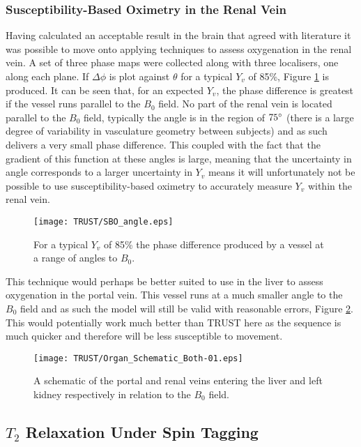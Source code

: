 \subsubsection{Susceptibility-Based Oximetry in the Renal Vein}
Having calculated an acceptable result in the brain that agreed with literature it was possible to move onto applying techniques to assess oxygenation in the renal vein. A set of three phase maps were collected along with three localisers, one along each plane. If $\Delta \phi$ is plot against $\theta$ for a typical $Y_v$ of 85\%, Figure \ref{fig:SBO_kidney} is produced. It can be seen that, for an expected $Y_v$, the phase difference is greatest if the vessel runs parallel to the $B_0$ field. No part of the renal vein is located parallel to the $B_0$ field, typically the angle is in the region of $75\degree$ (there is a large degree of variability in vasculature geometry between subjects) and as such delivers a very small phase difference. This coupled with the fact that the gradient of this function at these angles is large, meaning that the uncertainty in angle corresponds to a larger uncertainty in $Y_v$ means it will unfortunately not be possible to use susceptibility-based oximetry to accurately measure $Y_v$ within the renal vein.\\

\begin{figure}[H]
	\centering
	\texttt{[image: TRUST/SBO\_angle.eps]}
	\caption{For a typical $Y_v$ of 85\% the phase difference produced by a vessel at a range of angles to $B_0$.}
	\label{fig:SBO_kidney}	
\end{figure}
This technique would perhaps be better suited to use in the liver to assess oxygenation in the portal vein. This vessel runs at a much smaller angle to the $B_0$ field and as such the model will still be valid with reasonable errors, Figure \ref{fig:PV}. This would potentially work much better than \ac{TRUST} here as the sequence is much quicker and therefore will be less susceptible to movement.

\begin{figure}[H]
	\centering
	\texttt{[image: TRUST/Organ\_Schematic\_Both-01.eps]}
	\caption{A schematic of the portal and renal veins entering the liver and left kidney respectively in relation to the $B_0$ field.}
	\label{fig:PV}	
\end{figure}

\subsection{$T_2$ Relaxation Under Spin Tagging}
